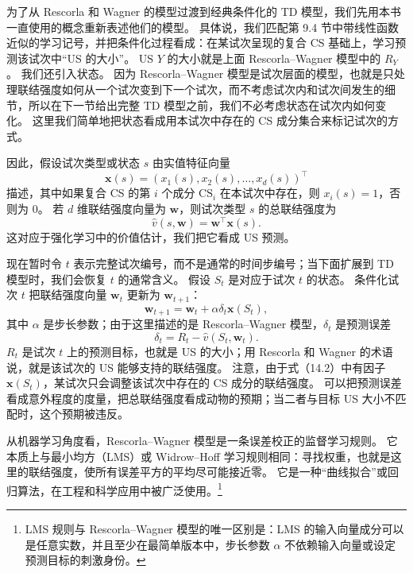 \documentclass[UTF8,12pt,a4paper,fontset=fandol]{ctexart}
\begin{document}
为了从 Rescorla 和 Wagner 的模型过渡到经典条件化的 TD 模型，我们先用本书一直使用的概念重新表述他们的模型。
具体说，我们匹配第 9.4 节中带线性函数近似的学习记号，并把条件化过程看成：在某试次呈现的复合 CS 基础上，学习预测该试次中“US 的大小”。
US $Y$ 的大小就是上面 Rescorla--Wagner 模型中的 $R_Y$。
我们还引入状态。
因为 Rescorla--Wagner 模型是试次层面的模型，也就是只处理联结强度如何从一个试次变到下一个试次，而不考虑试次内和试次间发生的细节，所以在下一节给出完整 TD 模型之前，我们不必考虑状态在试次内如何变化。
这里我们简单地把状态看成用本试次中存在的 CS 成分集合来标记试次的方式。

因此，假设试次类型或状态 $s$ 由实值特征向量
\[
\mathbf{x}(s)=(x_1(s),x_2(s),\ldots,x_d(s))^\top
\]
描述，其中如果复合 CS 的第 $i$ 个成分 $\mathrm{CS}_i$ 在本试次中存在，则 $x_i(s)=1$，否则为 $0$。
若 $d$ 维联结强度向量为 $\mathbf{w}$，则试次类型 $s$ 的总联结强度为
\begin{equation}
\hat v(s,\mathbf{w})=\mathbf{w}^\top\mathbf{x}(s).
\tag{14.1}
\end{equation}
这对应于强化学习中的价值估计，我们把它看成 US 预测。

现在暂时令 $t$ 表示完整试次编号，而不是通常的时间步编号；当下面扩展到 TD 模型时，我们会恢复 $t$ 的通常含义。
假设 $S_t$ 是对应于试次 $t$ 的状态。
条件化试次 $t$ 把联结强度向量 $\mathbf{w}_t$ 更新为 $\mathbf{w}_{t+1}$：
\begin{equation}
\mathbf{w}_{t+1}=\mathbf{w}_t+\alpha\delta_t\mathbf{x}(S_t),
\tag{14.2}
\end{equation}
其中 $\alpha$ 是步长参数；由于这里描述的是 Rescorla--Wagner 模型，$\delta_t$ 是预测误差
\begin{equation}
\delta_t=R_t-\hat v(S_t,\mathbf{w}_t).
\tag{14.3}
\end{equation}
$R_t$ 是试次 $t$ 上的预测目标，也就是 US 的大小；用 Rescorla 和 Wagner 的术语说，就是该试次的 US 能够支持的联结强度。
注意，由于式（14.2）中有因子 $\mathbf{x}(S_t)$，某试次只会调整该试次中存在的 CS 成分的联结强度。
可以把预测误差看成意外程度的度量，把总联结强度看成动物的预期；当二者与目标 US 大小不匹配时，这个预期被违反。

从机器学习角度看，Rescorla--Wagner 模型是一条误差校正的监督学习规则。
它本质上与最小均方（LMS）或 Widrow--Hoff 学习规则相同：寻找权重，也就是这里的联结强度，使所有误差平方的平均尽可能接近零。
它是一种“曲线拟合”或回归算法，在工程和科学应用中被广泛使用。\footnote{LMS 规则与 Rescorla--Wagner 模型的唯一区别是：LMS 的输入向量成分可以是任意实数，并且至少在最简单版本中，步长参数 $\alpha$ 不依赖输入向量或设定预测目标的刺激身份。}
\end{document}
